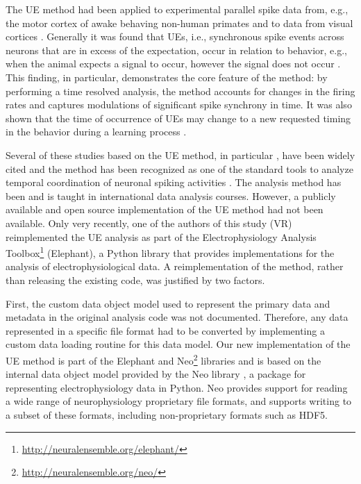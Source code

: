 \documentclass[10pt,a4paper,onecolumn]{article}
\begin{document}
The UE method had been applied to experimental parallel spike data from,
e.g., the motor cortex of awake behaving non-human primates
\autocites{Riehle97}{Gruen99}{Grammont99}{Riehle2000}{Gruen03b}{Kilavik09}{Denker10}{Denker11}
and to data from visual cortices \autocites{Maldonado08}{Ito11}.
Generally it was found that UEs, i.e., synchronous spike events across
neurons that are in excess of the expectation, occur in relation to
behavior, e.g., when the animal expects a signal to occur, however the
signal does not occur \autocite{Riehle97}. This finding, in particular,
demonstrates the core feature of the method: by performing a time
resolved analysis, the method accounts for changes in the firing rates
and captures modulations of significant spike synchrony in time. It was
also shown that the time of occurrence of UEs may change to a new
requested timing in the behavior during a learning process
\autocite{Kilavik09}.

Several of these studies based on the UE method, in particular
\autocite{Riehle97}, have been widely cited and the method has been
recognized as one of the standard tools to analyze temporal coordination
of neuronal spiking activities \autocites{Brown04_456}{Nakahara02}. The
analysis method has been and is taught in international data analysis
courses. However, a publicly available and open source implementation of
the UE method had not been available. Only very recently, one of the
authors of this study (VR) reimplemented the UE analysis as part of the
Electrophysiology Analysis Toolbox\footnote{\url{http://neuralensemble.org/elephant/}}
(Elephant), a Python library that provides implementations for the
analysis of electrophysiological data. A reimplementation of the method,
rather than releasing the existing code, was justified by two factors.

First, the custom data object model used to represent the primary data
and metadata in the original analysis code was not documented.
Therefore, any data represented in a specific file format had to be
converted by implementing a custom data loading routine for this data
model. Our new implementation of the UE method is part of the Elephant
and Neo\footnote{\url{http://neuralensemble.org/neo/}} libraries and is
based on the internal data object model provided by the Neo library
\autocite{Garcia14}, a package for representing electrophysiology data
in Python. Neo provides support for reading a wide range of
neurophysiology proprietary file formats, and supports writing to a
subset of these formats, including non-proprietary formats such as HDF5.
\end{document}
